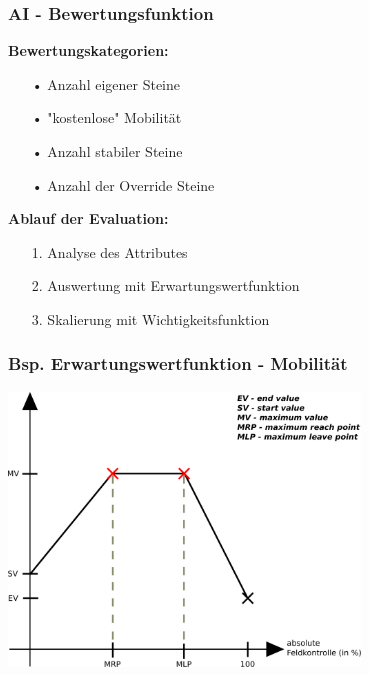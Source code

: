 \documentclass{beamer}
\begin{document}

\begin{frame}
\frametitle{AI - Bewertungsfunktion}

\textbf{Bewertungskategorien:}
\begin{enumerate}
\item[•] Anzahl eigener Steine
\item[•] "kostenlose" Mobilität
\item[•] Anzahl stabiler Steine
\item[•] Anzahl der Override Steine
\end{enumerate}

\pause
\hfill\break

\textbf{Ablauf der Evaluation:}
\begin{enumerate}
\item[1.] Analyse des Attributes
\item[2.] Auswertung mit Erwartungswertfunktion
\item[3.] Skalierung mit Wichtigkeitsfunktion
\end{enumerate}


\end{frame}


\begin{frame}
\frametitle{Bsp. Erwartungswertfunktion - Mobilität}
\centering
\includegraphics[width = 0.7\textwidth]{ExpectedValueGraphEdited.pdf}
\end{frame}

\end{document}
